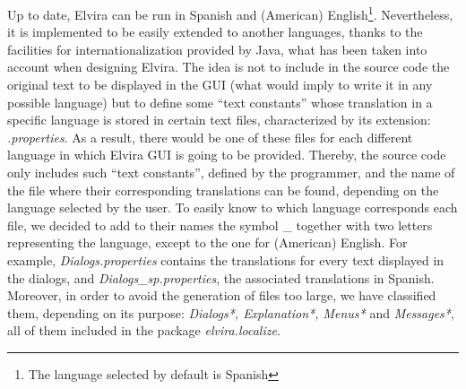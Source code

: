 Up to date, Elvira can be run in Spanish and (American)
English\footnote{The language selected by default is Spanish}.
Nevertheless, it is implemented to be easily extended to another
languages, thanks to the facilities for internationalization
provided by Java, what has been taken into account when designing
Elvira. The idea is not to include in the source code the original
text to be displayed in the GUI (what would imply to write it in
any possible language) but to define some ``text constants'' whose
translation in a specific language is stored in certain text
files, characterized by its extension: \emph{.properties}. As a
result, there would be one of these files for each different
language in which Elvira GUI is going to be provided. Thereby, the
source code only includes such ``text constants'', defined by the
programmer, and the name of the file where their corresponding
translations can be found, depending on the language selected by
the user. To easily know to which language corresponds each file,
we decided to add to their names the symbol \_ together with two
letters representing the language, except to the one for
(American) English. For example, \emph{Dialogs.properties}
contains the translations for every text displayed in the dialogs,
and \emph{Dialogs\_sp.properties}, the associated translations in
Spanish. Moreover, in order to avoid the generation of files too
large, we have classified them, depending on its purpose:
\emph{Dialogs*, Explanation*, Menus*} and \emph{Messages*}, all of
them included in the package \emph{elvira.localize}.
